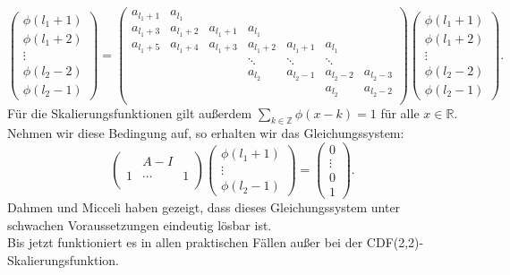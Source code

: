 \documentclass[11pt,a4paper,titlepage]{article}
\theoremstyle{plain} %
\theoremstyle{definition} %
\numberwithin{equation}{section} %
\begin{document}
	\begin{equation}
		\begin{pmatrix}
		\phi(l_1+1)\\
		\phi(l_1+2)\\
		\vdots	\\
		\phi(l_2-2)\\
		\phi(l_2-1)
		\end{pmatrix}
		=
		\begin{pmatrix}
		a_{l_1+1} & a_{l_1} &	&	&	& 		&\\
		a_{l_1+3} & a_{l_1+2} & a_{l_1+1} & a_{l_1} &	&	&\\
		a_{l_1+5}& a_{l_1+4} & a_{l_1+3} & a_{l_1+2} & a_{l_1+1} & a_{l_1} \\
		&	&	&	\ddots	&	\ddots	&	\ddots	&	\\
		&	&	&		a_{l_2} & a_{l_2-1} & a_{l_2-2} & a_{l_2-3}\\
		 &	&	&		 &  & a_{l_2} & a_{l_2-2}\\
		\end{pmatrix}	
		\begin{pmatrix}
		\phi(l_1+1)\\
		\phi(l_1+2)\\
		\vdots	\\
		\phi(l_2-2)\\
		\phi(l_2-1)
		\end{pmatrix}.	
	\end{equation}
	Für die Skalierungsfunktionen gilt außerdem $\sum_{k\in \mathbb{Z}} \phi(x-k)=1 $ für alle $x \in \mathbb{R}$. Nehmen wir diese Bedingung auf, so erhalten wir das Gleichungssystem: 
	\begin{equation}
		\begin{pmatrix}
			&	A-I \\
			1 & \cdots & 1\\
		\end{pmatrix}
			\begin{pmatrix}
		\phi(l_1+1)\\
		\vdots	\\
		\phi(l_2-1)
		\end{pmatrix}
		=
		\begin{pmatrix}
		0\\
		\vdots\\
		0\\
		1
		\end{pmatrix}.
	\end{equation}
	Dahmen und Micceli haben gezeigt, dass dieses Gleichungssystem unter schwachen Voraussetzungen eindeutig lösbar ist.\\
	Bis jetzt funktioniert es in allen praktischen Fällen außer bei der CDF(2,2)-Skalierungsfunktion.\\
	
\end{document}
